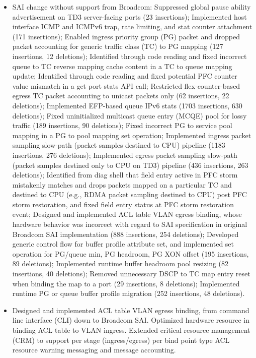 \documentclass[letterpaper,11pt]{article}
\newcommand{\resitem}[1]{\item #1 \vspace{-2pt}}
\begin{document}
\begin{CJK}{UTF8}{gbsn}
\begin{itemize}
\begin{itemize}
  \resitem{SAI change without support from Broadcom: Suppressed global pause ability advertisement on TD3 server-facing ports (23 insertions);
  Implemented host interface ICMP and ICMPv6 trap, rate limiting, and stat counter attachment (171 insertions);
  Enabled ingress priority group (PG) packet and dropped packet accounting for generic traffic class (TC) to PG mapping (127 insertions, 12 deletions);
  Identified through code reading and fixed incorrect queue to TC reverse mapping cache content in a TC to queue mapping update;
  Identified through code reading and fixed potential PFC counter value mismatch in a get port stats API call;
  Restricted flex-counter-based egress TC packet accounting to unicast packets only (62 insertions, 22 deletions);
  Implemented EFP-based queue IPv6 stats (1703 insertions, 630 deletions);
  Fixed uninitialized multicast queue entry (MCQE) pool for lossy traffic (189 insertions, 90 deletions);
  Fixed incorrect PG to service pool mapping in a PG to pool mapping set operation;
  Implemented ingress packet sampling slow-path (packet samples destined to CPU) pipeline (1183 insertions, 276 deletions);
  Implemented egress packet sampling slow-path (packet samples destined only to CPU on TD3) pipeline (436 insertions, 263 deletions);
  Identified from diag shell that field entry active in PFC storm mistakenly matches and drops packets
  mapped on a particular TC and destined to CPU (e.g., RDMA packet sampling destined to CPU) post PFC storm restoration,
  and fixed field entry status at PFC storm restoration event;
  Designed and implemented ACL table VLAN egress binding, whose hardware behavior was incorrect
  with regard to SAI specification in original Broadcom SAI implementation (888 insertions, 254 deletions);
  Developed generic control flow for buffer profile attribute set,
  and implemented set operation for PG/queue min, PG headroom, PG XON offset (195 insertions, 89 deletions);
  Implemented runtime buffer headroom pool resizing (82 insertions, 40 deletions);
  Removed unnecessary DSCP to TC map entry reset when binding the map to a port (29 insertions, 8 deletions);
  Implemented runtime PG or queue buffer profile migration (252 insertions, 48 deletions).
  }
  \resitem{Designed and implemented ACL table VLAN egress binding, from command line interface (CLI) down to Broadcom SAI.
  Optimized hardware resource in binding ACL table to VLAN ingress.
  Extended critical resource management (CRM) to support per stage (ingress/egress) per bind point type
  ACL resource warning messaging and message accounting.
}
\end{itemize}
\end{itemize}
\end{CJK}
\end{document}
